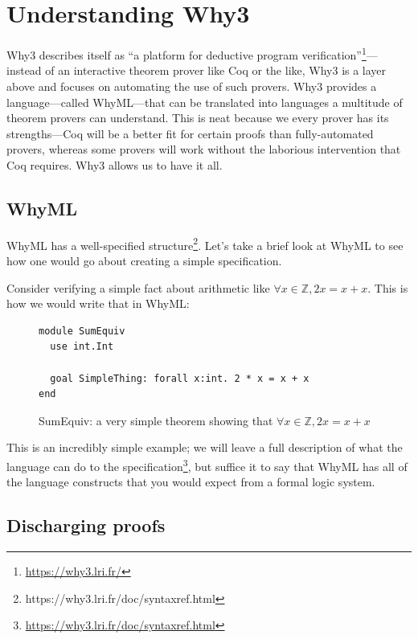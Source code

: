 \documentclass[12pt]{article}
\begin{document}

\section{Understanding Why3}
\label{why-why3}

Why3 describes itself as ``a platform for deductive program verification''\footnote{\url{https://why3.lri.fr/}}---instead of an interactive theorem prover like Coq or the like, Why3 is a layer above and focuses on automating the use of such provers.\cite{bobotWhy3ShepherdYour}
Why3 provides a language---called WhyML---that can be translated into languages a multitude of theorem provers can understand.
This is neat because we every prover has its strengths---Coq will be a better fit for certain proofs than fully-automated provers, whereas some provers will work without the laborious intervention that Coq requires.
Why3 allows us to have it all.

\subsection{WhyML}

WhyML has a well-specified structure\footnote{https://why3.lri.fr/doc/syntaxref.html}.
Let's take a brief look at WhyML to see how one would go about creating a simple specification.

Consider verifying a simple fact about arithmetic like $\forall x \in \mathbb{Z}, 2x = x + x$.
This is how we would write that in WhyML:

\begin{figure}[h]
\centering
\begin{verbatim}
module SumEquiv
  use int.Int

  goal SimpleThing: forall x:int. 2 * x = x + x
end
\end{verbatim}
\caption{SumEquiv: a very simple theorem showing that $\forall x \in \mathbb{Z}, 2x = x + x$}
\label{fig:sumequiv}
\end{figure}

This is an incredibly simple example; we will leave a full description of what the language can do to the specification\footnote{\url{https://why3.lri.fr/doc/syntaxref.html}}, but suffice it to say that WhyML has all of the language constructs that you would expect from a formal logic system.


\subsection{Discharging proofs}
\end{document}
